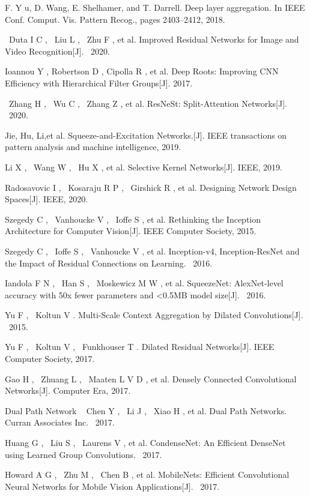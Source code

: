 \documentclass[15pt]{article}
\begin{document}
\begin{thebibliography}{99}
 F. Y u, D. Wang, E. Shelhamer, and T. Darrell. Deep layer aggregation. In IEEE Conf. Comput. Vis. Pattern Recog., pages 2403–2412, 2018.

 Duta I C ,  Liu L ,  Zhu F , et al. Improved Residual Networks for Image and Video Recognition[J].  2020.

 Ioannou Y , Robertson D , Cipolla R , et al. Deep Roots: Improving CNN Efficiency with Hierarchical Filter Groups[J]. 2017.

 Zhang H ,  Wu C ,  Zhang Z , et al. ResNeSt: Split-Attention Networks[J].  2020.

 Jie, Hu, Li,et al. Squeeze-and-Excitation Networks.[J]. IEEE transactions on pattern analysis and machine intelligence, 2019.

 Li X ,  Wang W ,  Hu X , et al. Selective Kernel Networks[J]. IEEE, 2019.

 Radosavovic I ,  Kosaraju R P ,  Girshick R , et al. Designing Network Design Spaces[J]. IEEE, 2020.

 Szegedy C ,  Vanhoucke V ,  Ioffe S , et al. Rethinking the Inception Architecture for Computer Vision[J]. IEEE Computer Society, 2015.

 Szegedy C ,  Ioffe S ,  Vanhoucke V , et al. Inception-v4, Inception-ResNet and the Impact of Residual Connections on Learning.  2016.

 Iandola F N ,  Han S ,  Moskewicz M W , et al. SqueezeNet: AlexNet-level accuracy with 50x fewer parameters and <0.5MB model size[J].  2016.

 Yu F ,  Koltun V . Multi-Scale Context Aggregation by Dilated Convolutions[J].  2015.

 Yu F ,  Koltun V ,  Funkhouser T . Dilated Residual Networks[J]. IEEE Computer Society, 2017.

 Gao H ,  Zhuang L ,  Maaten L V D , et al. Densely Connected Convolutional Networks[J]. Computer Era, 2017.

 Dual Path Network   Chen Y ,  Li J ,  Xiao H , et al. Dual Path Networks. Curran Associates Inc.  2017.

 Huang G ,  Liu S ,  Laurens V , et al. CondenseNet: An Efficient DenseNet using Learned Group Convolutions.  2017.

 Howard A G ,  Zhu M ,  Chen B , et al. MobileNets: Efficient Convolutional Neural Networks for Mobile Vision Applications[J].  2017.


\end{thebibliography}
\end{document}
